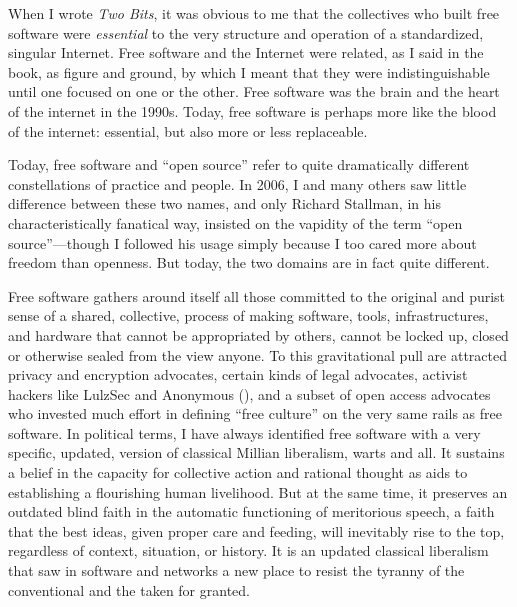 \documentclass[11pt]{article}
\begin{document}
When I wrote \emph{Two Bits}, it was obvious to me that the collectives who built free software were \emph{essential} to the very structure and operation of a standardized, singular Internet.  Free software and the Internet were related, as I said in the book, as figure and ground, by which I meant that they were indistinguishable until one focused on one or the other. Free software was the brain and the heart of the internet in the 1990s.  Today, free software is perhaps more like the blood of the internet: essential, but also more or less replaceable.

Today, free software and ``open source'' refer to quite dramatically different constellations of practice and people.  In 2006, I and many others saw little difference between these two names, and only Richard Stallman, in his characteristically fanatical way, insisted on the vapidity of the term ``open source''---though I followed his usage simply because I too cared more about freedom than openness.  But today, the two domains are in fact quite different.

Free software gathers around itself all those committed to the original and purist sense of a shared, collective, process of making software, tools, infrastructures, and hardware that cannot be appropriated by others, cannot be locked up, closed or otherwise sealed from the view anyone.  To this gravitational pull are attracted privacy and encryption advocates, certain kinds of legal advocates, activist hackers like LulzSec and Anonymous (\cite{coleman_hacker_2014}), and a subset of open access advocates who invested much effort in defining ``free culture'' on the very same rails as free software.  In political terms, I have always identified free software with a very specific, updated, version of classical Millian liberalism, warts and all.  It sustains a belief in the capacity for collective action and rational thought as aids to establishing a flourishing human livelihood.  But at the same time, it preserves an outdated blind faith in the automatic functioning of meritorious speech, a faith that the best ideas, given proper care and feeding, will inevitably rise to the top, regardless of context, situation, or history.  It is an updated classical liberalism that saw in software and networks a new place to resist the tyranny of the conventional and the taken for granted.  
\end{document}

